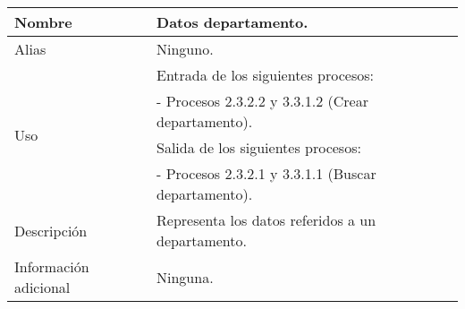 \begin{center}
  \begin{tabular}{| l | p{9cm} |}
    \hline
    Nombre & \textbf{Datos departamento}.\\
    \hline
    Alias & Ninguno.\\
    \hline
    \multirow{4}{*}{Uso} & Entrada de los siguientes procesos:\\
                         & - Procesos 2.3.2.2 y 3.3.1.2 (Crear departamento).\\
                         & Salida de los siguientes procesos:\\
                         & - Procesos 2.3.2.1 y 3.3.1.1 (Buscar departamento).\\
    \hline
    Descripción & Representa los datos referidos a un departamento.\\
    \hline
    Información adicional & Ninguna.\\
    \hline
  \end{tabular}
\end{center}
